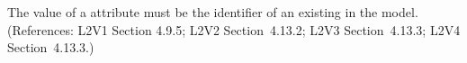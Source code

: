 The value of a \SpeciesReference {} attribute must be the
identifier of an existing \Species in the model.  (References: L2V1 Section
4.9.5; L2V2 Section~4.13.2; L2V3 Section~4.13.3; L2V4 Section~4.13.3.)
